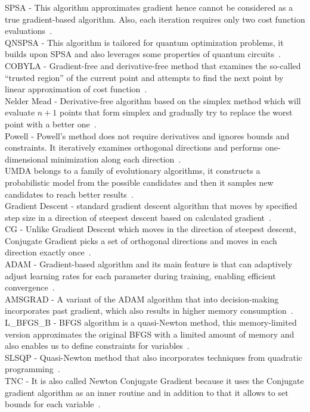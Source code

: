 SPSA - This algorithm approximates gradient hence cannot be considered as a true gradient-based algorithm. Also, each iteration requires only two cost function evaluations~\cite{spsa}.\\
QNSPSA - This algorithm is tailored for quantum optimization problems, it builds upon SPSA and also leverages some properties of quantum circuits~\cite{qnspsa}.\\
COBYLA - Gradient-free and derivative-free method that examines the so-called ``trusted region'' of the current point and attempts to find the next point by linear approximation of cost function~\cite{cobyla}.\\
Nelder Mead - Derivative-free algorithm based on the simplex method which will evaluate $n+1$ points that form simplex and gradually try to replace the worst point with a better one~\cite{nelder_mead}.\\
Powell - Powell's method does not require derivatives and ignores bounds and constraints. It iteratively examines orthogonal directions and performs one-dimensional minimization along each direction~\cite{powell}.\\
UMDA belongs to a family of evolutionary algorithms, it constructs a probabilistic model from the possible candidates and then it samples new candidates to reach better results~\cite{umda}.\\
Gradient Descent - standard gradient descent algorithm that moves by specified step size in a direction of steepest descent based on calculated gradient~\cite{gd}.\\
CG - Unlike Gradient Descent which moves in the direction of steepest descent, Conjugate Gradient picks a set of orthogonal directions and moves in each direction exactly once~\cite{cg}.\\ 
ADAM - Gradient-based algorithm and its main feature is that can adaptively adjust learning rates for each parameter during training, enabling efficient convergence~\cite{adam}.\\
AMSGRAD - A variant of the ADAM algorithm that into decision-making incorporates past gradient, which also results in higher memory consumption~\cite{amsgrad}.\\
L\_BFGS\_B - BFGS algorithm is a quasi-Newton method, this memory-limited version approximates the original BFGS with a limited amount of memory and also enables us to define constraints for variables~\cite{lbfgsb}.\\
SLSQP - Quasi-Newton method that also incorporates techniques from quadratic programming~\cite{slsqp}.\\
TNC - It is also called Newton Conjugate Gradient because it uses the Conjugate gradient algorithm as an inner routine and in addition to that it allows to set bounds for each variable~\cite{tnc}.

